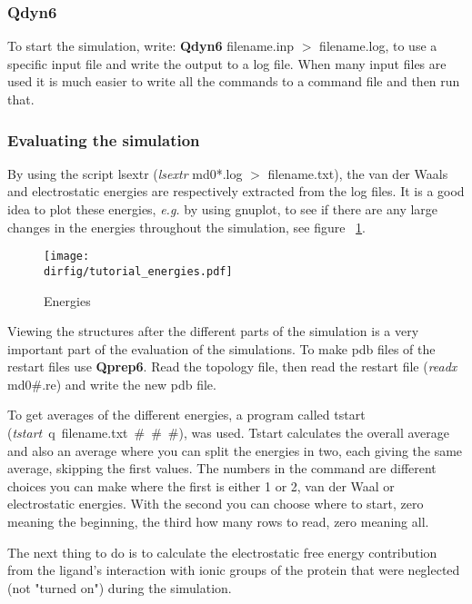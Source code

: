 \documentclass[a4paper,11pt]{article}
\newcommand{\dirfig}{./pictures}
\let\origref\ref
\def\ref#1{\unskip~\origref{#1}}
\begin{document}
\subsubsection{\textbf{Qdyn6}}
To  start  the  simulation,   write:  \textbf{Qdyn6}  filename.inp  $>$
filename.log, to use  a specific input file and write  the output to a
log file. When  many input files are  used it is much  easier to write
all the commands to a command file and then run that.

\subsubsection{Evaluating the simulation}
By   using   the   script   lsextr   (\textit{lsextr}   md0*.log   $>$
filename.txt),  the  van  der  Waals and  electrostatic  energies  are
respectively extracted from  the log files. It is a  good idea to plot
these energies,  \textit{e.g.} by using  gnuplot, to see if  there are
any  large changes  in  the energies  throughout  the simulation,  see
figure \ref{fig:tutorial_energies}.

\begin{figure}[h]
\centerline{\texttt{[image: \\dirfig/tutorial\_energies.pdf]}}
\caption{Energies} \label{fig:tutorial_energies}
\end{figure}

Viewing the structures after the  different parts of the simulation is
a very  important part of the  evaluation of the simulations.  To make
pdb files of  the restart files use \textbf{Qprep6}.  Read the topology
file, then read the restart file (\textit{readx }md0{\#}.re) and write
the new pdb file.

To get  averages of  the different energies,  a program  called tstart
(\textit{tstart~}{\-}q~filename.txt~{\#}~{\#}~{\#}), was used.  Tstart
calculates the overall average and also an average where you can split
the energies in two, each giving  the same average, skipping the first
values. The numbers in the command  are different choices you can make
where  the first  is either  1  or 2,  van der  Waal or  electrostatic
energies. With the second you can  choose where to start, zero meaning
the beginning, the third how many rows to read, zero meaning all.

The next  thing to do  is to  calculate the electrostatic  free energy
contribution from  the ligand's interaction  with ionic groups  of the
protein   that   were  neglected   (not   "turned   on")  during   the
simulation.
\end{document}

